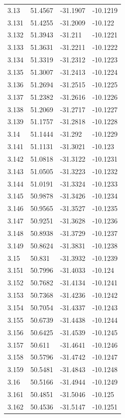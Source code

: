 \begin{tabular}{llll}
3.13 & 51.4567 & -31.1907 & -10.1219 \\
3.131 & 51.4255 & -31.2009 & -10.122 \\
3.132 & 51.3943 & -31.211 & -10.1221 \\
3.133 & 51.3631 & -31.2211 & -10.1222 \\
3.134 & 51.3319 & -31.2312 & -10.1223 \\
3.135 & 51.3007 & -31.2413 & -10.1224 \\
3.136 & 51.2694 & -31.2515 & -10.1225 \\
3.137 & 51.2382 & -31.2616 & -10.1226 \\
3.138 & 51.2069 & -31.2717 & -10.1227 \\
3.139 & 51.1757 & -31.2818 & -10.1228 \\
3.14 & 51.1444 & -31.292 & -10.1229 \\
3.141 & 51.1131 & -31.3021 & -10.123 \\
3.142 & 51.0818 & -31.3122 & -10.1231 \\
3.143 & 51.0505 & -31.3223 & -10.1232 \\
3.144 & 51.0191 & -31.3324 & -10.1233 \\
3.145 & 50.9878 & -31.3426 & -10.1234 \\
3.146 & 50.9565 & -31.3527 & -10.1235 \\
3.147 & 50.9251 & -31.3628 & -10.1236 \\
3.148 & 50.8938 & -31.3729 & -10.1237 \\
3.149 & 50.8624 & -31.3831 & -10.1238 \\
3.15 & 50.831 & -31.3932 & -10.1239 \\
3.151 & 50.7996 & -31.4033 & -10.124 \\
3.152 & 50.7682 & -31.4134 & -10.1241 \\
3.153 & 50.7368 & -31.4236 & -10.1242 \\
3.154 & 50.7054 & -31.4337 & -10.1243 \\
3.155 & 50.6739 & -31.4438 & -10.1244 \\
3.156 & 50.6425 & -31.4539 & -10.1245 \\
3.157 & 50.611 & -31.4641 & -10.1246 \\
3.158 & 50.5796 & -31.4742 & -10.1247 \\
3.159 & 50.5481 & -31.4843 & -10.1248 \\
3.16 & 50.5166 & -31.4944 & -10.1249 \\
3.161 & 50.4851 & -31.5046 & -10.125 \\
3.162 & 50.4536 & -31.5147 & -10.1251 \\

\end{tabular}
